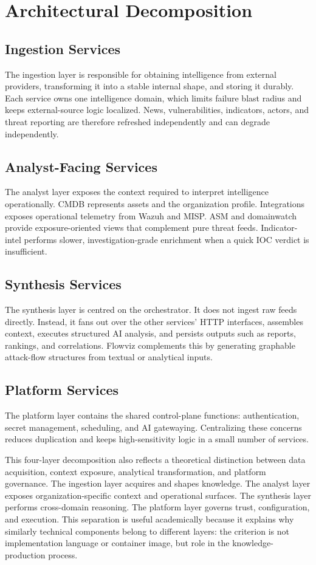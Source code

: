 \section{Architectural Decomposition}
\subsection{Ingestion Services}
The ingestion layer is responsible for obtaining intelligence from external providers, transforming it into a stable internal shape, and storing it durably. Each service owns one intelligence domain, which limits failure blast radius and keeps external-source logic localized. News, vulnerabilities, indicators, actors, and threat reporting are therefore refreshed independently and can degrade independently.

\subsection{Analyst-Facing Services}
The analyst layer exposes the context required to interpret intelligence operationally. CMDB represents assets and the organization profile. Integrations exposes operational telemetry from Wazuh and MISP. ASM and domainwatch provide exposure-oriented views that complement pure threat feeds. Indicator-intel performs slower, investigation-grade enrichment when a quick IOC verdict is insufficient.

\subsection{Synthesis Services}
The synthesis layer is centred on the orchestrator. It does not ingest raw feeds directly. Instead, it fans out over the other services' HTTP interfaces, assembles context, executes structured AI analysis, and persists outputs such as reports, rankings, and correlations. Flowviz complements this by generating graphable attack-flow structures from textual or analytical inputs.

\subsection{Platform Services}
The platform layer contains the shared control-plane functions: authentication, secret management, scheduling, and AI gatewaying. Centralizing these concerns reduces duplication and keeps high-sensitivity logic in a small number of services.

This four-layer decomposition also reflects a theoretical distinction between data acquisition, context exposure, analytical transformation, and platform governance. The ingestion layer acquires and shapes knowledge. The analyst layer exposes organization-specific context and operational surfaces. The synthesis layer performs cross-domain reasoning. The platform layer governs trust, configuration, and execution. This separation is useful academically because it explains why similarly technical components belong to different layers: the criterion is not implementation language or container image, but role in the knowledge-production process.

